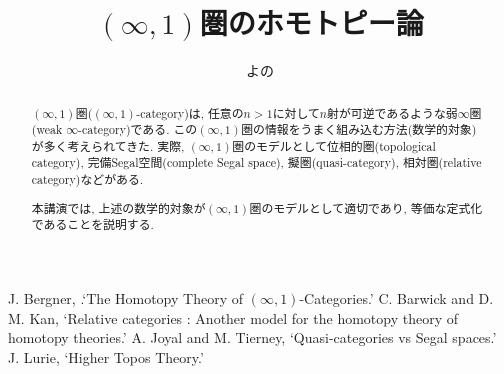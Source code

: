 \documentclass[uplatex, a4paper, 14pt, dvipdfmx]{jsarticle}
\title{$(\infty,1)$圏のホモトピー論}
\author{よの}
\date{}
\theoremstyle{jplain}
\numberwithin{theorem}{subsection}
\numberwithin{equation}{subsection}
\begin{document}
\maketitle

\begin{abstract}
  $(\infty,1)$圏($(\infty,1)$-category)は, 任意の$n>1$に対して$n$射が可逆であるような弱$\infty$圏(weak $\infty$-category)である.
  この$(\infty,1)$圏の情報をうまく組み込む方法(数学的対象)が多く考えられてきた. 
  実際, $(\infty,1)$圏のモデルとして位相的圏(topological category), 完備Segal空間(complete Segal space), 擬圏(quasi-category), 相対圏(relative category)などがある.
  
  本講演では, 上述の数学的対象が$(\infty,1)$圏のモデルとして適切であり, 等価な定式化であることを説明する. 
\end{abstract}

\small
\begin{thebibliography}{99}
   J. Bergner, .`The Homotopy Theory of $(\infty,1)$-Categories.'
   C. Barwick and D. M. Kan, `Relative categories : Another model for the homotopy theory of homotopy theories.' 
   A. Joyal and M. Tierney, `Quasi-categories vs Segal spaces.'
   J. Lurie, `Higher Topos Theory.' 
  \end{thebibliography}
\end{document}

